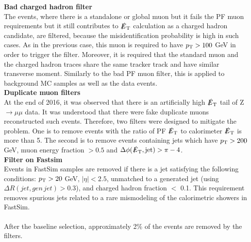 \textbf{Bad charged hadron filter}\\
The events, where there is a standalone or global muon but it fails the PF muon requirements but it still contributes to $\slashed{E}_{\rm T}$ calculation as a charged hadron candidate, are filtered,  because the misidentification probability is high in such cases. As in the previous case, this muon is required to have $p_{\rm T} > 100$ GeV in order to trigger the filter. Moreover, it is required that the standard muon and the charged hadron traces share the same tracker track and have similar transverse moment. Similarly to the bad PF muon filter, this is applied to background MC samples as well as the data events. \\
\textbf{Duplicate muon filters}\\
At the end of 2016, it was observed that there is an artificially high $\slashed{E}_{\rm T}$ tail of Z$\rightarrow\mu\mu$ data. It was understood that there were fake duplicate muons reconstructed such events.
Therefore, two filters were designed to mitigate the problem. One is to remove events with the ratio of PF $\slashed{E}_{\rm T}$ to calorimeter $\slashed{E}_{\rm T}$ is more than 5. The second is to remove events containing jets which have $p_{\rm T} > 200$ GeV, muon energy fraction $>0.5$ and $\Delta\phi({\rm \slashed{E}_{\rm T},jet})>\pi-4$.\\
\textbf{Filter on Fastsim}\\
Events in FastSim samples are removed if there is a jet satisfying the following conditions:  $p_{\rm T} > 20$ GeV, $|\eta|<2.5$, unmatched to a generated jet (using $\Delta R(jet,gen\,jet)>0.3$), and charged hadron fraction $<$ 0.1. This requirement removes spurious jets related to a rare mismodeling of the calorimetric showers in FastSim.
\\
\\
After the baseline selection, approximately 2\% of the events are removed by the filters.

